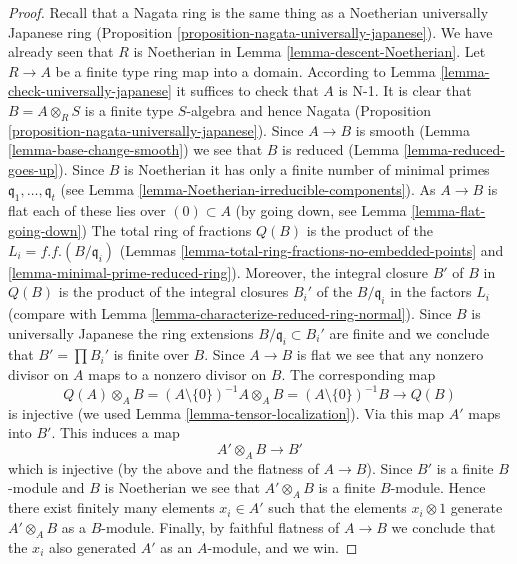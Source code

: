 \begin{proof}
Recall that a Nagata ring is the same thing as a Noetherian
universally Japanese ring
(Proposition \ref{proposition-nagata-universally-japanese}).
We have already seen that $R$ is Noetherian in
Lemma \ref{lemma-descent-Noetherian}.
Let $R \to A$ be a finite type ring map into a domain.
According to Lemma \ref{lemma-check-universally-japanese}
it suffices to check that $A$ is N-1.
It is clear that $B = A \otimes_R S$ is a finite type $S$-algebra
and hence Nagata (Proposition \ref{proposition-nagata-universally-japanese}).
Since $A \to B$ is smooth (Lemma \ref{lemma-base-change-smooth})
we see that $B$ is reduced (Lemma \ref{lemma-reduced-goes-up}).
Since $B$ is Noetherian it has only a finite number of minimal
primes $\mathfrak q_1, \ldots, \mathfrak q_t$ (see
Lemma \ref{lemma-Noetherian-irreducible-components}).
As $A \to B$ is flat each of these lies over $(0) \subset A$
(by going down, see Lemma \ref{lemma-flat-going-down})
The total ring of fractions $Q(B)$ is the product of the
$L_i = f.f.(B/\mathfrak q_i)$ (Lemmas
\ref{lemma-total-ring-fractions-no-embedded-points} and
\ref{lemma-minimal-prime-reduced-ring}).
Moreover, the integral closure $B'$ of $B$ in $Q(B)$ is
the product of the integral closures $B_i'$ of the $B/\mathfrak q_i$
in the factors $L_i$ (compare with
Lemma \ref{lemma-characterize-reduced-ring-normal}).
Since $B$ is universally Japanese the
ring extensions $B/\mathfrak q_i \subset B_i'$ are finite
and we conclude that $B' = \prod B_i'$ is finite over $B$.
Since $A \to B$ is flat we see that any
nonzero divisor on $A$ maps to a nonzero divisor on $B$.
The corresponding map
$$
Q(A) \otimes_A B = (A \setminus \{0\})^{-1}A \otimes_A B
= (A \setminus \{0\})^{-1}B \to Q(B)
$$
is injective (we used Lemma \ref{lemma-tensor-localization}).
Via this map $A'$ maps into $B'$. This induces a map
$$
A' \otimes_A B \longrightarrow B'
$$
which is injective (by the above and the flatness of $A \to B$).
Since $B'$ is a finite $B$-module
and $B$ is Noetherian we see that $A' \otimes_A B$ is a finite $B$-module.
Hence there exist finitely many elements $x_i \in A'$ such that
the elements $x_i \otimes 1$ generate $A' \otimes_A B$ as a $B$-module.
Finally, by faithful flatness of $A \to B$ we conclude that
the $x_i$ also generated $A'$ as an $A$-module, and we win.
\end{proof}

